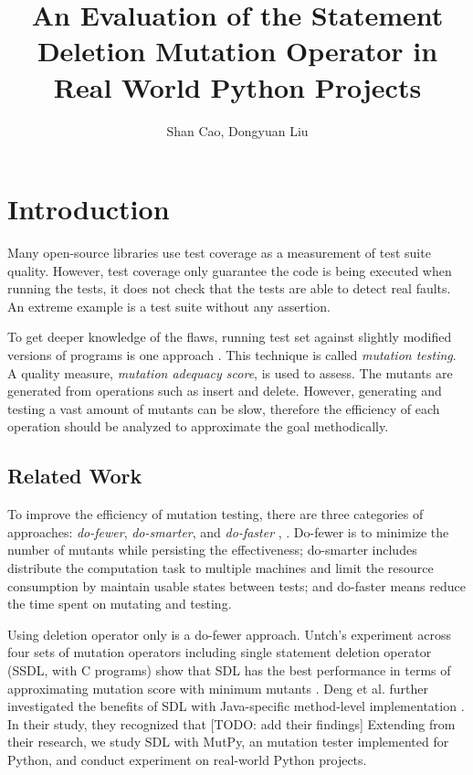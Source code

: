 \documentclass[12pt]{article}
\title{\textbf{An Evaluation of the Statement Deletion Mutation Operator in Real World Python Projects}}
\author{Shan Cao, Dongyuan Liu}
\begin{document}
\maketitle
\tableofcontents

\section{Introduction}

Many open-source libraries use test coverage as a measurement of test suite quality. However, test coverage only guarantee the code is being executed when running the tests, it does not check that the tests are able to detect real faults. An extreme example is a test suite without any assertion.

To get deeper knowledge of the flaws, running test set against slightly modified versions of programs is one approach \cite{demillo1978hints}. This technique is called \emph{mutation testing}. A quality measure, \emph{mutation adequacy score}, is used to assess. The mutants are generated from operations such as insert and delete. However, generating and testing a vast amount of mutants can be slow, therefore the efficiency of each operation should be analyzed to approximate the goal methodically.

\subsection{Related Work}

To improve the efficiency of mutation testing, there are three categories of approaches: \emph{do-fewer}, \emph{do-smarter}, and \emph{do-faster} \cite{untch1995schema}, \cite{offutt2001mutation}. Do-fewer is to minimize the number of mutants while persisting the effectiveness; do-smarter includes distribute the computation task to multiple machines and limit the resource consumption by maintain usable states between tests; and do-faster means reduce the time spent on mutating and testing.

Using deletion operator only is a do-fewer approach. Untch's experiment across four sets of mutation operators including single statement deletion operator (SSDL, with C programs) show that SDL has the best performance in terms of approximating mutation score with minimum mutants \cite{untch2009reduced}. Deng et al. further investigated the benefits of SDL with Java-specific method-level implementation \cite{deng2013empirical}. In their study, they recognized that [TODO: add their findings] Extending from their research, we study SDL with MutPy, an mutation tester implemented for Python, and conduct experiment on real-world Python projects.
\end{document}
